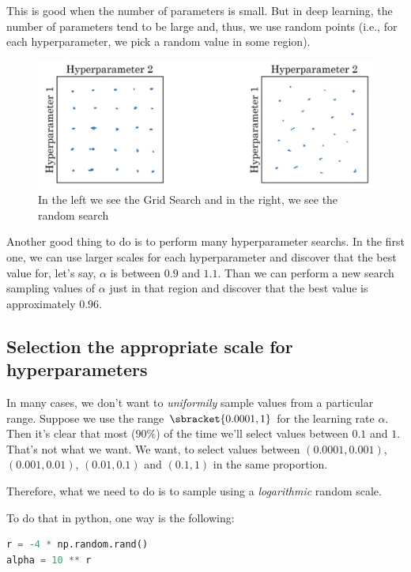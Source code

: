 \documentclass[12pt, a4paper, oneside]{book}
\begin{document}
This is good when the number of parameters is small. But in deep learning, the
number of parameters tend to be large and, thus, we use random points (i.e., for
each hyperparameter, we pick a random value in some region).

\begin{figure}[h]
\centering
\includegraphics[scale=0.4]{Res/hyperparamter-search.png}
\caption{In the left we see the Grid Search and in the right, we see the random
search}
\label{hyperparamter-search.png}
\end{figure}

Another good thing to do is to perform many hyperparameter searchs. In the first
one, we can use larger scales for each hyperparameter and discover that the best
value for, let's say, $\alpha$ is between $0.9$ and $1.1$. Than we can perform a
new search sampling values of $\alpha$ just in that region and discover that the
best value is approximately $0.96$.

\subsection{Selection the appropriate scale for hyperparameters}%
\label{sub:selection_the_appropriate_scale_for_hyperparameters}

In many cases, we don't want to \textit{uniformily} sample values from a
particular range. Suppose we use the range $\sbracket{0.0001, 1}$ for the
learning rate $\alpha$. Then it's clear that most ($90\%$) of the time we'll
select values between $0.1$ and $1$. That's not what we want. We want, to select
values between $(0.0001,0.001)$, $(0.001,0.01)$, $(0.01, 0.1)$ and $(0.1,1)$ in
the same proportion.

Therefore, what we need to do is to sample using a \textit{logarithmic} random
scale.

To do that in python, one way is the following:
\begin{lstlisting}[language=python]
r = -4 * np.random.rand()
alpha = 10 ** r
\end{lstlisting}
\end{document}

